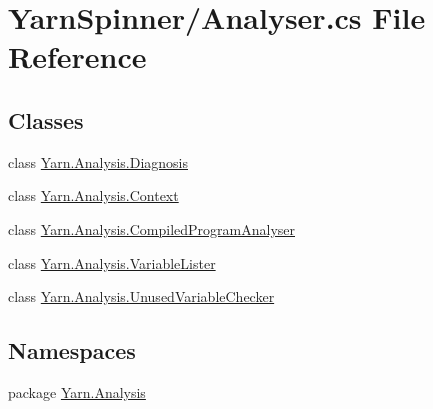 \hypertarget{a00279}{\section{Yarn\-Spinner/\-Analyser.cs File Reference}
\label{a00279}
}
\subsection*{Classes}
\begin{DoxyCompactItemize}
\item 
class \hyperlink{a00087}{Yarn.\-Analysis.\-Diagnosis}
\item 
class \hyperlink{a00054}{Yarn.\-Analysis.\-Context}
\item 
class \hyperlink{a00050}{Yarn.\-Analysis.\-Compiled\-Program\-Analyser}
\item 
class \hyperlink{a00166}{Yarn.\-Analysis.\-Variable\-Lister}
\item 
class \hyperlink{a00163}{Yarn.\-Analysis.\-Unused\-Variable\-Checker}
\end{DoxyCompactItemize}
\subsection*{Namespaces}
\begin{DoxyCompactItemize}
\item 
package \hyperlink{a00342}{Yarn.\-Analysis}
\end{DoxyCompactItemize}
